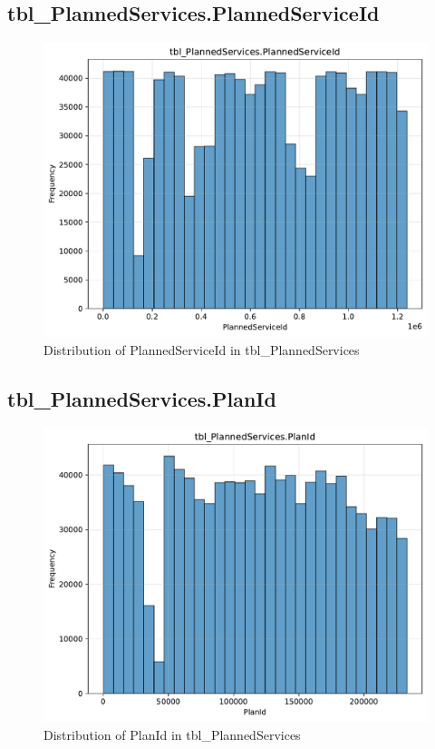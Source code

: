 \subsection{tbl\_PlannedServices.PlannedServiceId}

\begin{figure}[htbp]
\centering
\includegraphics[width=\textwidth]{figures/dbo_tbl_PlannedServices_PlannedServiceId.pdf}
\caption{Distribution of PlannedServiceId in tbl\_PlannedServices}
\end{figure}\newpage

\subsection{tbl\_PlannedServices.PlanId}

\begin{figure}[htbp]
\centering
\includegraphics[width=\textwidth]{figures/dbo_tbl_PlannedServices_PlanId.pdf}
\caption{Distribution of PlanId in tbl\_PlannedServices}
\end{figure}\newpage

